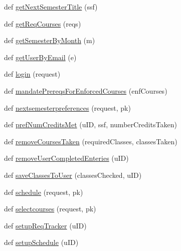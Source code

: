 \begin{DoxyCompactItemize}
\item 
def \mbox{\hyperlink{namespacemavAgenda_1_1landing_1_1views_a1715b2bbbb2491f5c6171b58c0f1b013}{get\+Next\+Semester\+Title}} (ssf)
\item 
def \mbox{\hyperlink{namespacemavAgenda_1_1landing_1_1views_ae93a61c9f4b55bee71f4753da73eae64}{get\+Req\+Courses}} (reqs)
\item 
def \mbox{\hyperlink{namespacemavAgenda_1_1landing_1_1views_a875d50bc3b626d8f6c1afa38bd5b646c}{get\+Semester\+By\+Month}} (m)
\item 
def \mbox{\hyperlink{namespacemavAgenda_1_1landing_1_1views_a3ae48839d5de2bf530de0413865c6bfe}{get\+User\+By\+Email}} (e)
\item 
def \mbox{\hyperlink{namespacemavAgenda_1_1landing_1_1views_aa1326a415f6c1e5ece0003f1db005087}{login}} (request)
\item 
def \mbox{\hyperlink{namespacemavAgenda_1_1landing_1_1views_abecce7b2d73935c98176d678866bfa1a}{mandate\+Prereqs\+For\+Enforced\+Courses}} (enf\+Courses)
\item 
def \mbox{\hyperlink{namespacemavAgenda_1_1landing_1_1views_afd6c90b52229e71e7b6fea7c5798cef7}{nextsemesterpreferences}} (request, pk)
\item 
def \mbox{\hyperlink{namespacemavAgenda_1_1landing_1_1views_a0244061e7eb138b3657aebe21a1cefbe}{pref\+Num\+Credits\+Met}} (u\+ID, ssf, number\+Credits\+Taken)
\item 
def \mbox{\hyperlink{namespacemavAgenda_1_1landing_1_1views_a2027dcc5c86c3c172808656237104ac6}{remove\+Courses\+Taken}} (required\+Classes, classes\+Taken)
\item 
def \mbox{\hyperlink{namespacemavAgenda_1_1landing_1_1views_ad44762f7b7b87274ee5b2bdd07fdf25a}{remove\+User\+Completed\+Enteries}} (u\+ID)
\item 
def \mbox{\hyperlink{namespacemavAgenda_1_1landing_1_1views_a09ee653c730bd8eb540ef674eebf01d3}{save\+Classes\+To\+User}} (classes\+Checked, u\+ID)
\item 
def \mbox{\hyperlink{namespacemavAgenda_1_1landing_1_1views_a38b95502a945bfe5e450db9b88dd802f}{schedule}} (request, pk)
\item 
def \mbox{\hyperlink{namespacemavAgenda_1_1landing_1_1views_a55d61c1738704e1297aa54c9c26fc31d}{selectcourses}} (request, pk)
\item 
def \mbox{\hyperlink{namespacemavAgenda_1_1landing_1_1views_a070695b43494f3b578bfdda9b8316a42}{setup\+Req\+Tracker}} (u\+ID)
\item 
def \mbox{\hyperlink{namespacemavAgenda_1_1landing_1_1views_a0917de5383aa4bc5f500a44777916555}{setup\+Schedule}} (u\+ID)

\end{DoxyCompactItemize}
